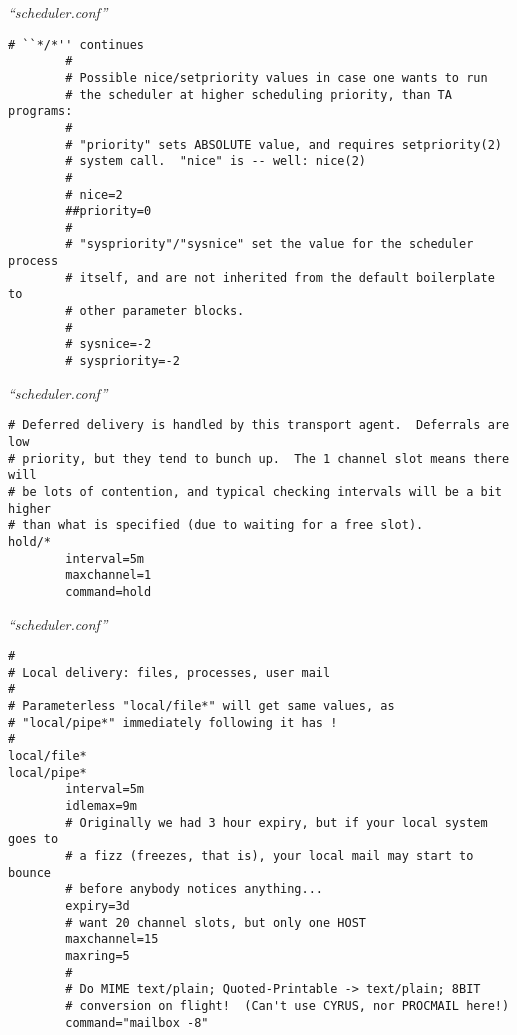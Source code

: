 \documentclass[a4paper,landscape]{slides}
\begin{document}
\begin{overlay}
\small
\centerline{{\em ``scheduler.conf''}}
\tiny
\begin{verbatim}
# ``*/*'' continues
        #
        # Possible nice/setpriority values in case one wants to run
        # the scheduler at higher scheduling priority, than TA programs:
        #
        # "priority" sets ABSOLUTE value, and requires setpriority(2)
        # system call.  "nice" is -- well: nice(2)
        #
        # nice=2
        ##priority=0
        #
        # "syspriority"/"sysnice" set the value for the scheduler process
        # itself, and are not inherited from the default boilerplate to
        # other parameter blocks.
        #
        # sysnice=-2
        # syspriority=-2
\end{verbatim}
\vfill
\end{overlay}
\begin{overlay}
\small
\centerline{{\em ``scheduler.conf''}}
\tiny
\begin{verbatim}
# Deferred delivery is handled by this transport agent.  Deferrals are low
# priority, but they tend to bunch up.  The 1 channel slot means there will
# be lots of contention, and typical checking intervals will be a bit higher
# than what is specified (due to waiting for a free slot).
hold/*
        interval=5m
        maxchannel=1
        command=hold
\end{verbatim}
\vfill
\end{overlay}
\begin{overlay}
\small
\centerline{{\em ``scheduler.conf''}}
\tiny
\begin{verbatim}
#
# Local delivery: files, processes, user mail
#
# Parameterless "local/file*" will get same values, as
# "local/pipe*" immediately following it has !
#
local/file*
local/pipe*
        interval=5m
        idlemax=9m
        # Originally we had 3 hour expiry, but if your local system goes to
        # a fizz (freezes, that is), your local mail may start to bounce
        # before anybody notices anything...
        expiry=3d
        # want 20 channel slots, but only one HOST
        maxchannel=15
        maxring=5
        #
        # Do MIME text/plain; Quoted-Printable -> text/plain; 8BIT
        # conversion on flight!  (Can't use CYRUS, nor PROCMAIL here!)
        command="mailbox -8"
\end{verbatim}
\vfill
\end{overlay}
\end{document}
